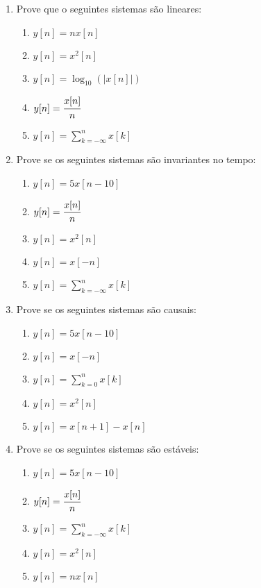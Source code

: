 \documentclass[]{book}
\theoremstyle{definition}
\newcommand{\bb}[1]{\mathbb{#1}}
\newcommand{\R}{\bb{R}}
\newcommand{\textdf}[1]{\textbf{\textsf{#1}}\index{#1}}
\newcommand{\ds}{\displaystyle}
\begin{document}
\begin{enumerate}
\item\label{norms} Prove que o seguintes sistemas são lineares:
\begin{enumerate}
\item $y[n] = nx[n]$
\item $y[n] = x^2[n]$
\item $y[n] = \log_{10}(|x[n]|)$
\item $y[n] = \cfrac{x[n]}{n}$
\item $y[n] = \sum\limits_{k=-\infty}^{n} x[k]$
\end{enumerate}

\item Prove se os seguintes sistemas são invariantes no tempo:
\begin{enumerate}
\item $y[n] = 5x[n-10]$
\item $y[n] = \cfrac{x[n]}{n}$
\item $y[n] = x^2[n]$
\item $y[n] = x[-n]$
\item $y[n] = \sum\limits_{k=-\infty}^{n} x[k]$
\end{enumerate}

\item Prove se os seguintes sistemas são causais:
\begin{enumerate}
\item $y[n] = 5x[n-10]$
\item $y[n] = x[-n]$
\item $y[n] = \sum\limits_{k=0}^{n} x[k]$
\item $y[n] = x^2[n]$
\item $y[n] = x[n + 1] - x[n]$
\end{enumerate}

\item Prove se os seguintes sistemas são estáveis:
\begin{enumerate}
\item $y[n] = 5x[n-10]$
\item $y[n] = \cfrac{x[n]}{n}$
\item $y[n] = \sum\limits_{k=-\infty}^{n} x[k]$
\item $y[n] = x^2[n]$
\item $y[n] = nx[n]$
\end{enumerate}


\end{enumerate}
\end{document}
